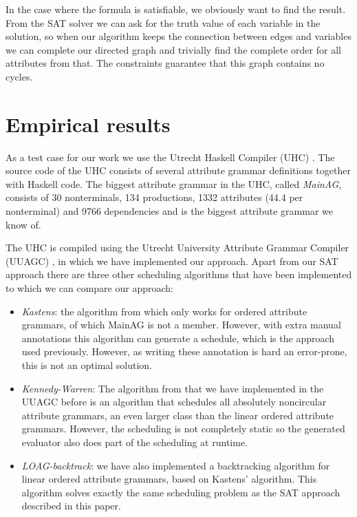 \documentclass{llncs}
\begin{document}
In the case where the formula is satisfiable, we obviously want to find the result. From the SAT solver we can ask for the truth value of each variable in the solution, so when our algorithm keeps the connection between edges and variables we can complete our directed graph and trivially find the complete order for all attributes from that. The constraints guarantee that this graph contains no cycles.

\section{Empirical results} \label{sect:results}
As a test case for our work we use the Utrecht Haskell Compiler (UHC) \cite{Dijkstra:2009}. The source code of the UHC consists of several attribute grammar definitions together with Haskell code. The biggest attribute grammar in the UHC, called \emph{MainAG}, consists of 30 nonterminals, 134 productions, 1332 attributes (44.4 per nonterminal) and 9766 dependencies and is the biggest attribute grammar we know of.

The UHC is compiled using the Utrecht University Attribute Grammar Compiler (UUAGC) \cite{combinator-languages}, in which we have implemented our approach. Apart from our SAT approach there are three other scheduling algorithms that have been implemented to which we can compare our approach:

\begin{itemize}
\item \emph{Kastens}: the algorithm from \cite{kastens80} which only works for ordered attribute grammars, of which MainAG is not a member. However, with extra manual annotations this algorithm can generate a schedule, which is the approach used previously. However, as writing these annotation is hard an error-prone, this is not an optimal solution.
\item \emph{Kennedy-Warren}: The algorithm from \cite{kennedywarren76} that we have implemented in the UUAGC before \cite{bransen2012} is an algorithm that schedules all absolutely noncircular attribute grammars, an even larger class than the linear ordered attribute grammars. However, the scheduling is not completely static so the generated evaluator also does part of the scheduling at runtime. 
\item \emph{LOAG-backtrack}: we have also implemented a backtracking algorithm \cite{Binsbergen:2015} for linear ordered attribute grammars, based on Kastens' algorithm. This algorithm solves exactly the same scheduling problem as the SAT approach described in this paper.
\end{itemize} 
\end{document}
